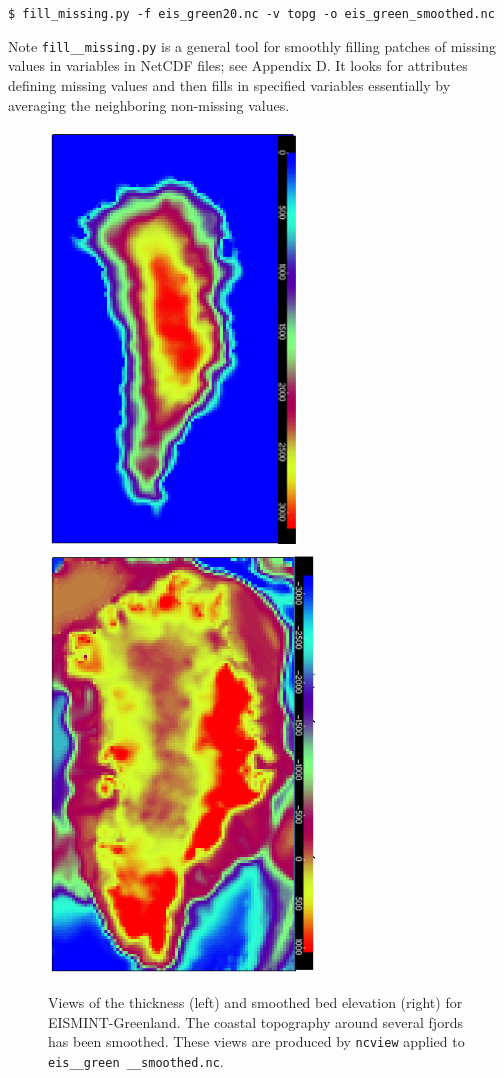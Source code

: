 \documentclass[11pt,final]{amsart}
\newcommand{\und}{\_\!\_}
\begin{document}
\verb|$ fill_missing.py -f eis_green20.nc -v topg -o eis_green_smoothed.nc|

\noindent Note \texttt{fill\und missing.py} is a general tool for smoothly filling patches of missing values in variables in NetCDF files; see Appendix D.  It looks for attributes defining missing values and then fills in specified variables essentially by averaging the neighboring non-missing values.

\begin{figure}[ht]
\includegraphics[width=2.6in,keepaspectratio=true]{figs/EISgreen_thick}\qquad\includegraphics[width=2.8in,keepaspectratio=true]{figs/EISgreen_bed}
\caption{Views of the thickness (left) and smoothed bed elevation (right) for EISMINT-Greenland.  The coastal topography around several fjords has been smoothed.  These views are produced by \texttt{ncview} applied to \texttt{eis\und green \und smoothed.nc}.}
\label{fig:greendata}
\end{figure}
\end{document}
